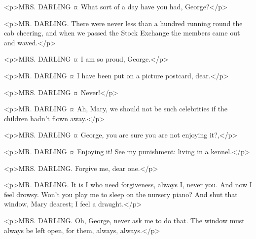 \begin{drama}
<p>MRS. DARLING ¤
What sort of a day have you had, George?</p>


<p>MR. DARLING. There were never less than a hundred running round the cab cheering, and when we passed the Stock Exchange the members came out and waved.</p>


<p>MRS. DARLING ¤
I am so proud, George.</p>

<p>MR. DARLING ¤
I have been put on a picture postcard, dear.</p>

<p>MRS. DARLING ¤
Never!</p>

<p>MR. DARLING ¤
Ah, Mary, we should not be such celebrities if the children hadn't flown away.</p>

<p>MRS. DARLING ¤
George, you are sure you are not enjoying it?,</p>

<p>MR. DARLING ¤
Enjoying it! See my punishment: living in a kennel.</p>

<p>MRS. DARLING. Forgive me, dear one.</p>

<p>MR. DARLING. It is I who need forgiveness, always I, never you. And now I feel drowsy.
Won't you play me to sleep on the nursery piano? And shut that window, Mary dearest; I feel a draught.</p>

<p>MRS. DARLING. Oh, George, never ask me to do that. The window must always be left open, for them, always, always.</p>



\end{drama}
